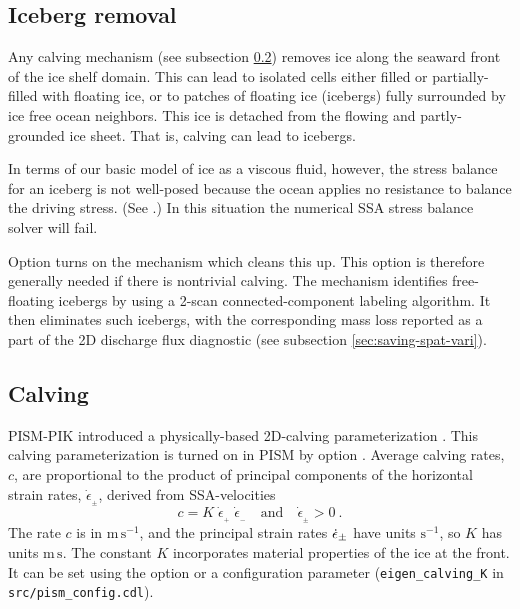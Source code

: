 \subsection{Iceberg removal}
\label{sec:kill-icebergs}
Any calving mechanism (see subsection \ref{sec:calving}) removes ice along the seaward front of the ice shelf domain.  This can lead to isolated cells either filled or partially-filled with floating ice, or to patches of floating ice (icebergs) fully surrounded by ice free ocean neighbors.  This ice is detached from the flowing and partly-grounded ice sheet.  That is, calving can lead to icebergs.

In terms of our basic model of ice as a viscous fluid, however, the stress balance for an iceberg is not well-posed because the ocean applies no resistance to balance the driving stress.  (See \cite{SchoofStream}.)  In this situation the numerical SSA stress balance solver will fail.

Option  turns on the mechanism which cleans this up.  This option is therefore generally needed if there is nontrivial calving.  The mechanism identifies free-floating icebergs by using a 2-scan connected-component labeling algorithm.  It then eliminates such icebergs, with the corresponding mass loss reported as a part of the 2D discharge flux diagnostic (see subsection \ref{sec:saving-spat-vari}).

\subsection{Calving}
\label{sec:calving}
PISM-PIK introduced a physically-based 2D-calving parameterization \cite{Levermannetal2012}.  This calving parameterization is turned on in PISM by option .  Average calving rates, $c$, are proportional to the product of principal components of the horizontal strain rates, $\dot{\epsilon}_{_\pm}$, derived from SSA-velocities 
\begin{equation}
\label{eq: calv2}
c = K\; \dot{\epsilon}_{_+}\; \dot{\epsilon}_{_-}\quad\text{and}\quad\dot{\epsilon}_{_\pm}>0\:.
\end{equation}
The rate $c$ is in $\text{m}\,\text{s}^{-1}$, and the principal strain rates $\dot{\epsilon}_\pm$ have units $\text{s}^{-1}$, so $K$ has units $\text{m}\,\text{s}$.  The constant $K$ incorporates material properties of the ice at the front.  It can be set using the  option or a configuration parameter (\texttt{eigen_calving_K} in \texttt{src/pism_config.cdl}).


